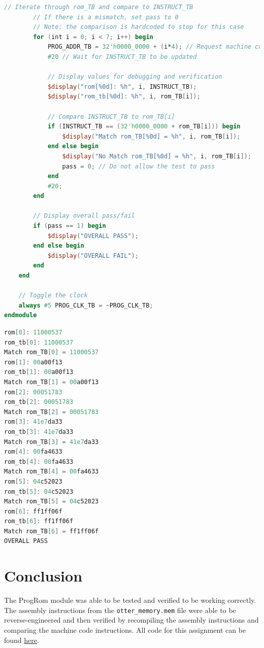 \documentclass[
    a4paper, %
	12pt, %
    ]{CSSullivanBusinessReport}
\begin{document}
\begin{fullwidth}
\begin{lstlisting}[language=Verilog, caption=Assembly instructions from reverse engineered file]
        // Iterate through rom_TB and compare to INSTRUCT_TB
        // If there is a mismatch, set pass to 0
        // Note: the comparison is hardcoded to stop for this case
        for (int i = 0; i < 7; i++) begin
            PROG_ADDR_TB = 32'h0000_0000 + (i*4); // Request machine code instruction from address
            #20 // Wait for INSTRUCT_TB to be updated

            // Display values for debugging and verification
            $display("rom[%0d]: %h", i, INSTRUCT_TB);
            $display("rom_tb[%0d]: %h", i, rom_TB[i]);

            // Compare INSTRUCT_TB to rom_TB[i]
            if (INSTRUCT_TB == (32'h0000_0000 + rom_TB[i])) begin
                $display("Match rom_TB[%0d] = %h", i, rom_TB[i]);
            end else begin
                $display("No Match rom_TB[%0d] = %h", i, rom_TB[i]);
                pass = 0; // Do not allow the test to pass
            end
            #20;
        end

        // Display overall pass/fail
        if (pass == 1) begin
            $display("OVERALL PASS");
        end else begin
            $display("OVERALL FAIL");
        end 
    end

    // Toggle the clock
    always #5 PROG_CLK_TB = ~PROG_CLK_TB;
endmodule
\end{lstlisting}




\begin{lstlisting}[language=Verilog, caption=TCl Output from ProgRom\_TB]
rom[0]: 11000537
rom_tb[0]: 11000537
Match rom_TB[0] = 11000537
rom[1]: 00a00f13
rom_tb[1]: 00a00f13
Match rom_TB[1] = 00a00f13
rom[2]: 00051783
rom_tb[2]: 00051783
Match rom_TB[2] = 00051783
rom[3]: 41e7da33
rom_tb[3]: 41e7da33
Match rom_TB[3] = 41e7da33
rom[4]: 00fa4633
rom_tb[4]: 00fa4633
Match rom_TB[4] = 00fa4633
rom[5]: 04c52023
rom_tb[5]: 04c52023
Match rom_TB[5] = 04c52023
rom[6]: ff1ff06f
rom_tb[6]: ff1ff06f
Match rom_TB[6] = ff1ff06f
OVERALL PASS
\end{lstlisting}

\section {Conclusion} %
\hypersetup{urlcolor=blue} 
The ProgRom module was able to be tested and verified to be working correctly. The assembly instructions from the \verb|otter_memory.mem| file were able to be reverse-engineered and then verified by recompiling the assembly instructions and comparing the machine code instructions.
All code for this assignment can be found \href{https://github.com/EthanV1920/CPE-233-Otter/tree/main}{here}.



\end{fullwidth}
\end{document}
